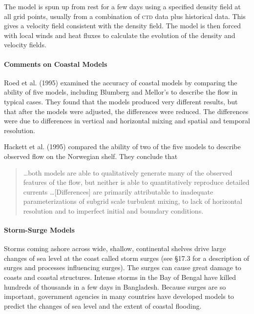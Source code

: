 The model is spun up from rest for a few days using a specified density field at
all grid points, usually from a combination of \textsc{ctd} data plus historical
data. This gives a velocity field consistent with the density field. The
model is then forced with local winds and heat fluxes to calculate the evolution
of the density and velocity fields.

\paragraph{Comments on Coastal Models} Roed et al. (1995) examined the
accuracy of coastal models by comparing the ability of
five models, including Blumberg and Mellor's to describe the flow in typical cases. They found
that the models produced very different results, but that after the models were adjusted, the
differences were reduced. The differences were due to differences in vertical and
horizontal mixing and spatial and temporal
resolution.

Hackett et al. (1995) compared the ability of two of the five models to describe
observed flow on the Norwegian shelf. They conclude that
\begin{quote} \small
\ldots both models are able to qualitatively
generate many of the observed features of the flow, but neither is able to
quantitatively reproduce detailed currents \ldots [Differences] are primarily
attributable to inadequate parameterizations of subgrid scale turbulent mixing, to lack of horizontal resolution and to imperfect initial and boundary
conditions.
\end{quote}

\paragraph{Storm-Surge Models} Storms coming ashore across wide, shallow, continental shelves drive large changes of sea level at the coast called storm surges (see \S 17.3 for a description of surges and processes influencing surges). The surges can cause great damage to coasts and coastal structures. Intense storms in the Bay of Bengal have killed hundreds of thousands in a few days in Bangladesh. Because surges are so important, government agencies in many countries have developed models to predict the changes of sea level and the extent of coastal flooding.

